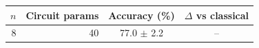 \begin{tabular}{rrcc}
\toprule
$n$ & Circuit params & Accuracy (\%) & $\Delta$ vs classical \\
\midrule
8 & 40 & 77.0 $\pm$ 2.2 & -- \\
\bottomrule
\end{tabular}
